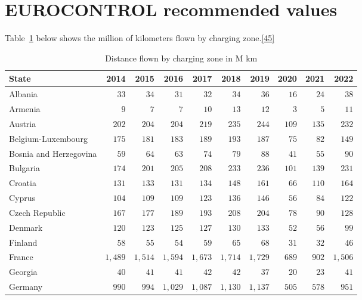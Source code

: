 \documentclass[
  11pt,
  a4paper,
]{book}
\begin{document}
\hypertarget{eurocontrol-recommended-values-18}{%
\section{EUROCONTROL recommended
values}\label{eurocontrol-recommended-values-18}}

Table~\ref{tbl-distance-flown} below shows the million of kilometers
flown by charging zone.\protect\hyperlink{ref-ace2020}{{[}45{]}}

\hypertarget{tbl-distance-flown}{}
\setlength{\LTpost}{0mm}
\begin{longtable}{lrrrrrrrrr}
\caption{\label{tbl-distance-flown}Distance flown by charging zone in M km }\tabularnewline

\toprule
State & 2014 & 2015 & 2016 & 2017 & 2018 & 2019 & 2020 & 2021 & 2022 \\ 
\midrule
Albania & $33$ & $34$ & $31$ & $32$ & $34$ & $36$ & $16$ & $24$ & $38$ \\ 
Armenia & $9$ & $7$ & $7$ & $10$ & $13$ & $12$ & $3$ & $5$ & $11$ \\ 
Austria & $202$ & $204$ & $204$ & $219$ & $235$ & $244$ & $109$ & $135$ & $232$ \\ 
Belgium-Luxembourg & $175$ & $181$ & $183$ & $189$ & $193$ & $187$ & $75$ & $82$ & $149$ \\ 
Bosnia and Herzegovina & $59$ & $64$ & $63$ & $74$ & $79$ & $88$ & $41$ & $55$ & $90$ \\ 
Bulgaria & $174$ & $201$ & $205$ & $208$ & $233$ & $236$ & $101$ & $139$ & $231$ \\ 
Croatia & $131$ & $133$ & $131$ & $134$ & $148$ & $161$ & $66$ & $110$ & $164$ \\ 
Cyprus & $104$ & $109$ & $109$ & $123$ & $136$ & $146$ & $56$ & $84$ & $122$ \\ 
Czech Republic & $167$ & $177$ & $189$ & $193$ & $208$ & $204$ & $78$ & $90$ & $128$ \\ 
Denmark & $120$ & $123$ & $125$ & $127$ & $130$ & $133$ & $52$ & $56$ & $99$ \\ 
Finland & $58$ & $55$ & $54$ & $59$ & $65$ & $68$ & $31$ & $32$ & $46$ \\ 
France & $1,489$ & $1,514$ & $1,594$ & $1,673$ & $1,714$ & $1,729$ & $689$ & $902$ & $1,506$ \\ 
Georgia & $40$ & $41$ & $41$ & $42$ & $42$ & $37$ & $20$ & $23$ & $41$ \\ 
Germany & $990$ & $994$ & $1,029$ & $1,087$ & $1,130$ & $1,137$ & $505$ & $578$ & $951$ \\ 

\end{longtable}
\end{document}
